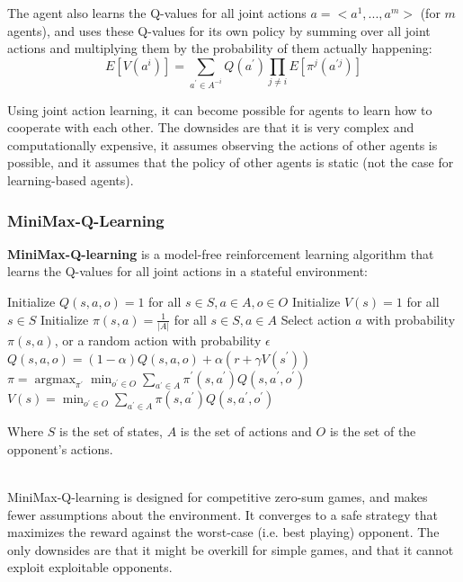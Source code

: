 \documentclass[12pt]{article}
\DeclareMathOperator*{\argmax}{argmax}
\begin{document}
\noindent
The agent also learns the Q-values for all joint actions $a = <a^1, ... , a^m>$ (for $m$ agents), and uses these Q-values for its own policy by summing over all joint actions and multiplying them by the probability of them actually happening:
\[ E[V(a^i)] = \sum_{a^\prime \in A^{-i}} Q(a^\prime) \prod_{j \neq i} E[\pi^j(a^{\prime j})] \]

\noindent
Using joint action learning, it can become possible for agents to learn how to cooperate with each other.
The downsides are that it is very complex and computationally expensive, it assumes observing the actions of other agents is possible, and it assumes that the policy of other agents is static (not the case for learning-based agents).

\subsubsection{MiniMax-Q-Learning}
\textbf{MiniMax-Q-learning} is a model-free reinforcement learning algorithm that learns the Q-values for all joint actions in a stateful environment:

\begin{algorithm}
    \caption{MiniMax-Q-Learning}
    \begin{algorithmic}[1]
        \State Initialize $Q(s, a, o) = 1$ for all $s \in S, a \in A, o \in O$ 
        \State Initialize $V(s) = 1$ for all $s \in S$ 
        \State Initialize $\pi(s, a) = \frac{1}{|A|}$ for all $s \in S, a \in A$ 
        \State
        \State Select action $a$ with probability $\pi(s, a)$, or a random action with probability $\epsilon$
        \State
        \State $Q(s, a, o) = (1 - \alpha)Q(s, a, o) + \alpha (r + \gamma V(s^\prime))$ 
        \State $\pi = \displaystyle\argmax_{\pi^\prime} \displaystyle\min_{o^\prime \in O} \displaystyle\sum_{a^\prime \in A} \pi^\prime(s, a^\prime) Q(s, a^\prime, o^\prime)$ 
        \State $V(s) = \displaystyle\min_{o^\prime \in O} \displaystyle\sum_{a^\prime \in A} \pi(s, a^\prime) Q(s, a^\prime, o^\prime)$
    \end{algorithmic}
\end{algorithm}

\noindent
Where $S$ is the set of states, $A$ is the set of actions and $O$ is the set of the opponent's actions.

\noindent
\\
MiniMax-Q-learning is designed for competitive zero-sum games, and makes fewer assumptions about the environment.
It converges to a safe strategy that maximizes the reward against the worst-case (i.e. best playing) opponent.
The only downsides are that it might be overkill for simple games, and that it cannot exploit exploitable opponents.
\end{document}
